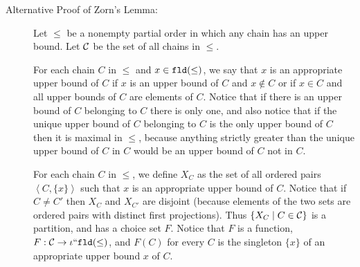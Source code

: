 \documentclass[12pt]{book}
\begin{document}
\begin{description}
\newpage

\item[Alternative Proof of Zorn's Lemma:]

Let $\leq$ be a nonempty partial order in which any chain
has an upper bound.  Let $\cal C$ be the set of all chains in $\leq$.

For each chain $C$ in $\leq$ and $x \in {\tt fld}(\leq)$, we say that
$x$ is an appropriate upper bound of $C$ if $x$ is an upper bound of
$C$ and $x \not\in C$ or if $x \in C$ and all upper bounds of $C$ are
elements of $C$.  Notice that if there is an upper bound of $C$
belonging to $C$ there is only one, and also notice that if the unique
upper bound of $C$ belonging to $C$ is the only upper bound of $C$
then it is maximal in $\leq$, because anything strictly greater than
the unique upper bound of $C$ in $C$ would be an upper bound of $C$
not in $C$.

For each chain $C$ in $\leq$, we define $X_C$ as the set of all
ordered pairs $\left<C,\{x\}\right>$ such that $x$ is an appropriate
upper bound of $C$.  Notice that if $C \neq C'$ then $X_C$ and
$X_{C'}$ are disjoint (because elements of the two sets are ordered
pairs with distinct first projections).  Thus $\{X_C \mid C \in {\cal
C}\}$ is a partition, and has a choice set $F$.  Notice that $F$ is a
function, $F:{\cal C} \rightarrow \iota``{\tt fld}(\leq)$, and $F(C)$
for every $C$ is the singleton $\{x\}$ of an appropriate upper bound
$x$ of $C$.


\end{description}
\end{document}
